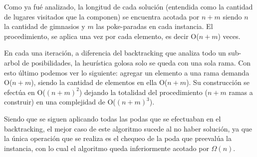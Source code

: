 Como ya fué analizado, la longitud de cada solución (entendida como la cantidad de lugares visitados que la componen) se encuentra acotada por $n + m$ siendo $n$ la cantidad de gimnasios y $m$ las poke-paradas en cada instancia. El procedimiento, se aplica una vez por cada elemento, es decir O($n+m$) veces.

En cada una iteración, a diferencia del backtracking que analiza todo un sub-arbol de posibilidades, la heur\'istica golosa solo se queda con una sola rama. Con esto último podemos ver lo siguiente: agregar un elemento a una rama demanda O($n+m$), siendo la cantidad de elementos en ella O($n+m$). Su construcción se efectúa en O($(n+m)^2$) dejando la totalidad del procedimiento ($n+m$ ramas a construir) en una complejidad de O($(n+m)^3$).

Siendo que se siguen aplicando todas las podas que se efectuaban en el backtracking, el mejor caso de este algoritmo sucede al no haber solución, ya que la única operación que se realiza es el chequeo de la poda que preevalúa la instancia, con lo cual el algoritmo queda inferiormente acotado por $\Omega(n)$.